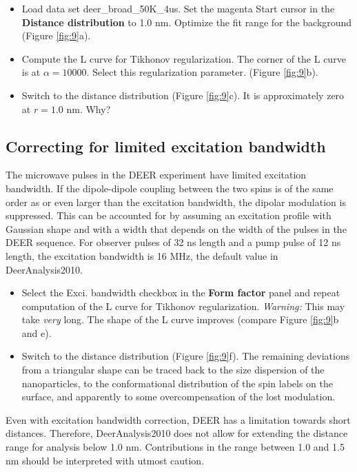 \documentclass[11pt,a4paper]{article}
\begin{document}
\begin{itemize}
	\item Load data set {\ttfamily deer\_broad\_50K\_4us}. Set the magenta {\ttfamily Start} cursor in the {\ttfamily \bf Distance distribution} to 1.0 nm. Optimize the fit range for the background (Figure \ref{fig:9}a).
	\item Compute the L curve for Tikhonov regularization. The corner of the L curve is at $\alpha = 10000$. Select this regularization parameter. (Figure \ref{fig:9}b).
	\item Switch to the distance distribution (Figure \ref{fig:9}c). It is approximately zero at $r=1.0$ nm. Why?  
\end{itemize}

\subsection{Correcting for limited excitation bandwidth}
The microwave pulses in the DEER experiment have limited excitation bandwidth. If the dipole-dipole coupling between the two spins is of the same order as or even larger than the excitation bandwidth, the dipolar modulation is suppressed. This can be accounted for by assuming an excitation profile with Gaussian shape and with a width that depends on the width of the pulses in the DEER sequence. For observer pulses of 32 ns length and a pump pulse of 12 ns length, the excitation bandwidth is 16 MHz, the default value in DeerAnalysis2010.      

\begin{itemize}
	\item Select the {\ttfamily Exci. bandwidth} checkbox in the {\ttfamily \bf Form factor} panel and repeat computation of the L curve for Tikhonov regularization. \emph{Warning:} This may take \emph{very} long. The shape of the L curve improves (compare Figure \ref{fig:9}b and e).
	\item Switch to the distance distribution (Figure \ref{fig:9}f). The remaining deviations from a triangular shape can be traced back to the size dispersion of the nanoparticles, to the conformational distribution of the spin labels on the surface, and apparently to some overcompensation of the lost modulation.  
\end{itemize}

Even with excitation bandwidth correction, DEER has a limitation towards short distances. Therefore, DeerAnalysis2010 does not allow for extending the distance range for analysis below 1.0 nm. Contributions in the range between 1.0 and 1.5 nm should be interpreted with utmost caution.
\end{document}
